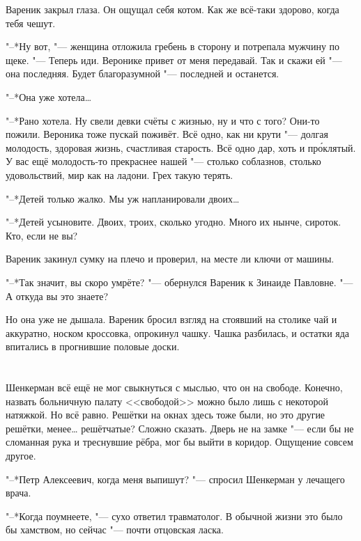 Вареник закрыл глаза.
Он ощущал себя котом.
Как же всё-таки здорово, когда тебя чешут.

"--*Ну вот, "--- женщина отложила гребень в сторону и потрепала мужчину по щеке.
"--- Теперь иди.
Веронике привет от меня передавай.
Так и скажи ей "--- она последняя.
Будет благоразумной "--- последней и останется.

"--*Она уже хотела\ldots{}

"--*Рано хотела.
Ну свели девки счёты с жизнью, ну и что с того?
Они-то пожили.
Вероника тоже пускай поживёт.
Всё одно, как ни крути "--- долгая молодость, здоровая жизнь, счастливая старость.
Всё одно дар, хоть и пр\'оклятый.
У вас ещё молодость-то прекраснее нашей "--- столько соблазнов, столько удовольствий, мир как на ладони.
Грех такую терять.

"--*Детей только жалко.
Мы уж напланировали двоих\ldots{}

"--*Детей усыновите.
Двоих, троих, сколько угодно.
Много их нынче, сироток.
Кто, если не вы?

Вареник закинул сумку на плечо и проверил, на месте ли ключи от машины.

"--*Так значит, вы скоро умрёте? "--- обернулся Вареник к Зинаиде Павловне.
"--- А откуда вы это знаете?

Но она уже не дышала.
Вареник бросил взгляд на стоявший на столике чай и аккуратно, носком кроссовка, опрокинул чашку.
Чашка разбилась, и остатки яда впитались в прогнившие половые доски.

\chapter{}

\textspace

Шенкерман всё ещё не мог свыкнуться с мыслью, что он на свободе.
Конечно, назвать больничную палату <<свободой>> можно было лишь с некоторой натяжкой.
Но всё равно.
Решётки на окнах здесь тоже были, но это другие решётки, менее\ldots{} решётчатые?
Сложно сказать.
Дверь не на замке "--- если бы не сломанная рука и треснувшие рёбра, мог бы выйти в коридор.
Ощущение совсем другое.

"--*Петр Алексеевич, когда меня выпишут? "--- спросил Шенкерман у лечащего врача.

"--*Когда поумнеете, "--- сухо ответил травматолог.
В обычной жизни это было бы хамством, но сейчас "--- почти отцовская ласка.

